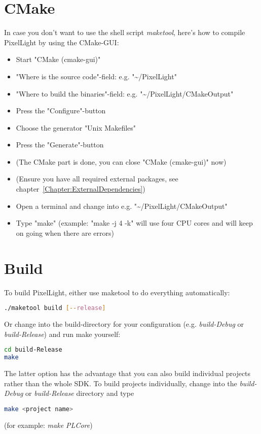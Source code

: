 \section{CMake}
In case you don't want to use the shell script \emph{maketool}, here's how to compile PixelLight by using the CMake-\ac{GUI}:
\begin{itemize}
\item{Start "CMake (cmake-gui)"}
\item{"Where is the source code"-field: e.g. "\textasciitilde /PixelLight"}
\item{"Where to build the binaries"-field: e.g. "\textasciitilde /PixelLight/CMakeOutput"}
\item{Press the "Configure"-button}
\item{Choose the generator "Unix Makefiles"}
\item{Press the "Generate"-button}
\item{(The CMake part is done, you can close "CMake (cmake-gui)" now)}
\item{(Ensure you have all required external packages, see chapter~\ref{Chapter:ExternalDependencies})}
\item{Open a terminal and change into e.g. "\textasciitilde /PixelLight/CMakeOutput"}
\item{Type "make" (example: "make -j 4 -k" will use four \ac{CPU} cores and will keep on going when there are errors)}
\end{itemize}




\section{Build}
To build PixelLight, either use maketool to do everything automatically:
\begin{lstlisting}[language=sh]
./maketool build [--release]
\end{lstlisting}

Or change into the build-directory for your configuration (e.g. \emph{build-Debug} or \emph{build-Release}) and run make yourself:
\begin{lstlisting}[language=sh]
cd build-Release
make
\end{lstlisting}

The latter option has the advantage that you can also build individual projects rather than the whole \ac{SDK}. To build projects individually, change into the \emph{build-Debug} or \emph{build-Release} directory and type
\begin{lstlisting}[language=sh]
make <project name>
\end{lstlisting}
(for example: \emph{make PLCore})


